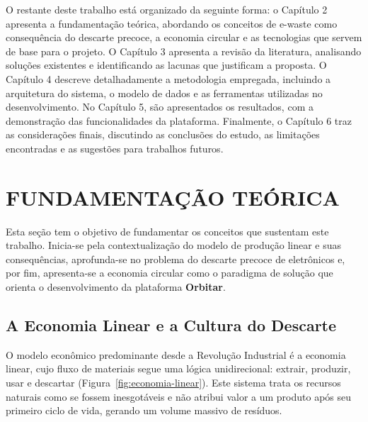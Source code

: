 \documentclass[
	12pt,				%
	openright,			%
	oneside,			%
	a4paper,			%
	english,			%
	brazil				%
	]{abntex2}
\theoremstyle{definition}
\begin{document}
O restante deste trabalho está organizado da seguinte forma: o Capítulo 2 apresenta a fundamentação teórica, abordando os conceitos de e-waste como consequência do descarte precoce, a economia circular e as tecnologias que servem de base para o projeto. O Capítulo 3 apresenta a revisão da literatura, analisando soluções existentes e identificando as lacunas que justificam a proposta. O Capítulo 4 descreve detalhadamente a metodologia empregada, incluindo a arquitetura do sistema, o modelo de dados e as ferramentas utilizadas no desenvolvimento. No Capítulo 5, são apresentados os resultados, com a demonstração das funcionalidades da plataforma. Finalmente, o Capítulo 6 traz as considerações finais, discutindo as conclusões do estudo, as limitações encontradas e as sugestões para trabalhos futuros.

\chapter[Fundamentação Teórica]{FUNDAMENTAÇÃO TEÓRICA}

Esta seção tem o objetivo de fundamentar os conceitos que sustentam este trabalho. Inicia-se pela contextualização do modelo de produção linear e suas consequências, aprofunda-se no problema do descarte precoce de eletrônicos e, por fim, apresenta-se a economia circular como o paradigma de solução que orienta o desenvolvimento da plataforma \textbf{Orbitar}.

\section{A Economia Linear e a Cultura do Descarte}

O modelo econômico predominante desde a Revolução Industrial é a economia linear, cujo fluxo de materiais segue uma lógica unidirecional: extrair, produzir, usar e descartar (Figura~\ref{fig:economia-linear}). Este sistema trata os recursos naturais como se fossem inesgotáveis e não atribui valor a um produto após seu primeiro ciclo de vida, gerando um volume massivo de resíduos.
\end{document}
